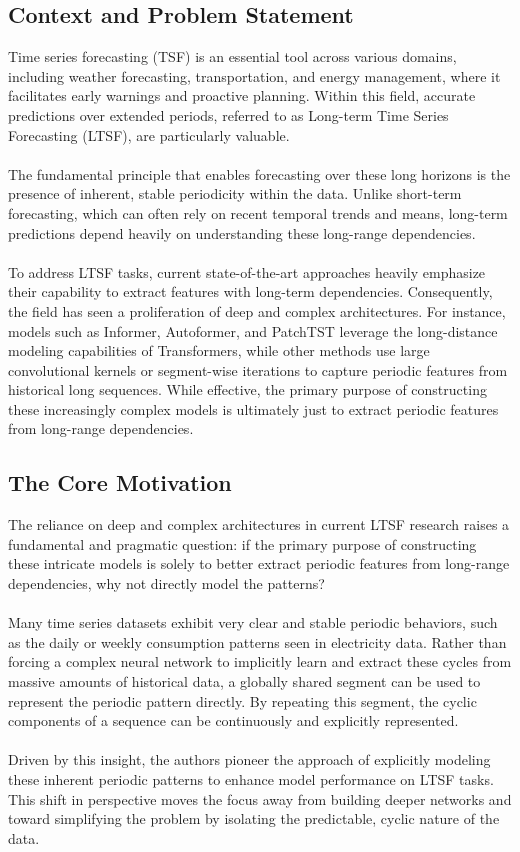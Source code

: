 \documentclass[10pt]{article}
\begin{document}
\subsection{Context and Problem Statement}
Time series forecasting (TSF) is an essential tool across various domains, including weather forecasting, transportation, and energy management, where it facilitates early warnings and proactive planning. Within this field, accurate predictions over extended periods, referred to as Long-term Time Series Forecasting (LTSF), are particularly valuable.\\
\\
The fundamental principle that enables forecasting over these long horizons is the presence of inherent, stable periodicity within the data. Unlike short-term forecasting, which can often rely on recent temporal trends and means, long-term predictions depend heavily on understanding these long-range dependencies.\\
\\
To address LTSF tasks, current state-of-the-art approaches heavily emphasize their capability to extract features with long-term dependencies. Consequently, the field has seen a proliferation of deep and complex architectures. For instance, models such as Informer, Autoformer, and PatchTST leverage the long-distance modeling capabilities of Transformers, while other methods use large convolutional kernels or segment-wise iterations to capture periodic features from historical long sequences. While effective, the primary purpose of constructing these increasingly complex models is ultimately just to extract periodic features from long-range dependencies. 

\subsection{The Core Motivation}
The reliance on deep and complex architectures in current LTSF research raises a fundamental and pragmatic question: if the primary purpose of constructing these intricate models is solely to better extract periodic features from long-range dependencies, why not directly model the patterns?\\
\\
Many time series datasets exhibit very clear and stable periodic behaviors, such as the daily or weekly consumption patterns seen in electricity data. Rather than forcing a complex neural network to implicitly learn and extract these cycles from massive amounts of historical data, a globally shared segment can be used to represent the periodic pattern directly. By repeating this segment, the cyclic components of a sequence can be continuously and explicitly represented.\\
\\
Driven by this insight, the authors pioneer the approach of explicitly modeling these inherent periodic patterns to enhance model performance on LTSF tasks. This shift in perspective moves the focus away from building deeper networks and toward simplifying the problem by isolating the predictable, cyclic nature of the data.  
\end{document}
